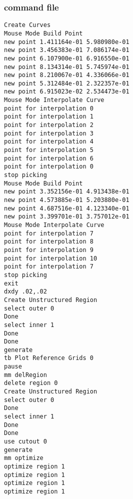 \documentclass[letterpaper,12pt]{article}
\begin{document}
\subsubsection{command file}
\begin{verbatim}
Create Curves
Mouse Mode Build Point
new point 1.411164e-01 5.980980e-01
new point 3.456383e-01 7.086174e-01
new point 6.107900e-01 6.916550e-01
new point 8.134314e-01 5.745974e-01
new point 8.210067e-01 4.336066e-01
new point 5.312484e-01 2.322357e-01
new point 6.915023e-02 2.534473e-01
Mouse Mode Interpolate Curve
point for interpolation 0
point for interpolation 1
point for interpolation 2
point for interpolation 3
point for interpolation 4
point for interpolation 5
point for interpolation 6
point for interpolation 0
stop picking
Mouse Mode Build Point
new point 3.352156e-01 4.913438e-01
new point 4.573885e-01 5.203880e-01
new point 4.687516e-01 4.123340e-01
new point 3.399701e-01 3.757012e-01
Mouse Mode Interpolate Curve
point for interpolation 7
point for interpolation 8
point for interpolation 9
point for interpolation 10
point for interpolation 7
stop picking
exit
dxdy .02,.02
Create Unstructured Region
select outer 0
Done
select inner 1
Done
Done
generate
tb Plot Reference Grids 0
pause
mm delRegion
delete region 0
Create Unstructured Region
select outer 0
Done
select inner 1
Done
Done
use cutout 0
generate
mm optimize
optimize region 1
optimize region 1
optimize region 1
optimize region 1
\end{verbatim}
\end{document}
